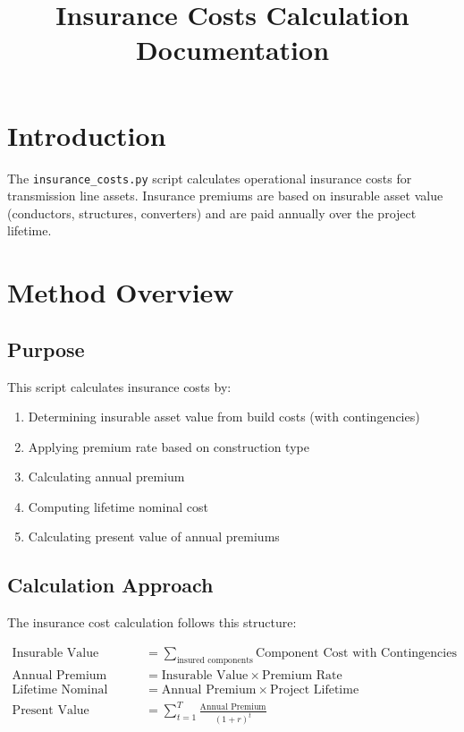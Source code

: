 \documentclass[12pt]{article}
\title{Insurance Costs Calculation Documentation}
\author{}
\date{}
\begin{document}
\maketitle

\section{Introduction}

The \texttt{insurance\_costs.py} script calculates operational insurance costs for transmission line assets. Insurance premiums are based on insurable asset value (conductors, structures, converters) and are paid annually over the project lifetime.

\section{Method Overview}

\subsection{Purpose}

This script calculates insurance costs by:
\begin{enumerate}
    \item Determining insurable asset value from build costs (with contingencies)
    \item Applying premium rate based on construction type
    \item Calculating annual premium
    \item Computing lifetime nominal cost
    \item Calculating present value of annual premiums
\end{enumerate}

\subsection{Calculation Approach}

The insurance cost calculation follows this structure:

\begin{align}
\text{Insurable Value} &= \sum_{\text{insured components}} \text{Component Cost with Contingencies} \\
\text{Annual Premium} &= \text{Insurable Value} \times \text{Premium Rate} \\
\text{Lifetime Nominal Cost} &= \text{Annual Premium} \times \text{Project Lifetime} \\
\text{Present Value} &= \sum_{t=1}^{T} \frac{\text{Annual Premium}}{(1 + r)^t}
\end{align}
\end{document}
